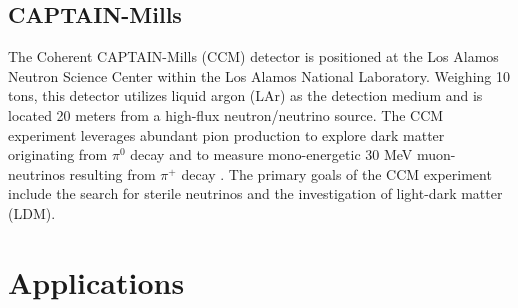 \subsection{ CAPTAIN-Mills}

The Coherent CAPTAIN-Mills (CCM) detector is positioned at the Los Alamos Neutron Science Center within the Los Alamos National Laboratory. Weighing 10 tons, this detector utilizes liquid argon (LAr) as the detection medium and is located 20 meters from a high-flux neutron/neutrino source. The CCM experiment leverages abundant pion production to explore dark matter originating from $\pi^0$ decay and to measure mono-energetic 30 MeV muon-neutrinos resulting from $\pi^+$ decay \cite{aguilararevalo2022dark}. The primary goals of the CCM experiment include the search for sterile neutrinos and the investigation of light-dark matter (LDM).
 \newpage
\section{Applications}


